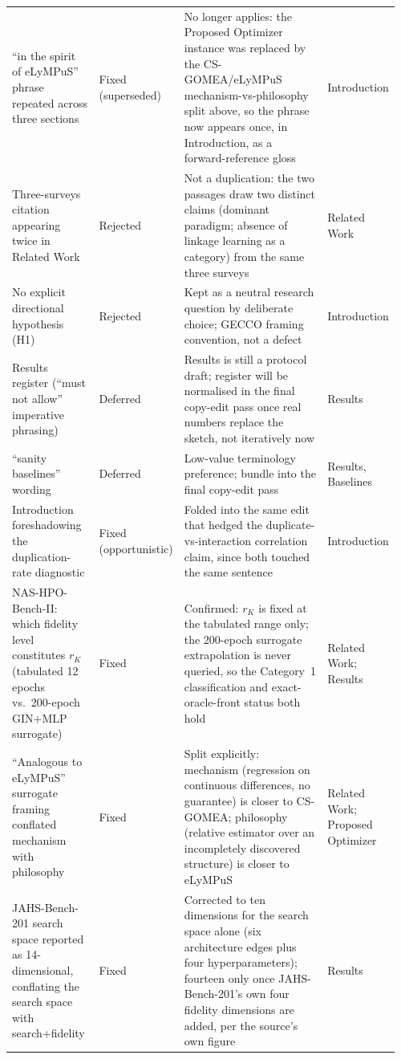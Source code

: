 \begin{longtable}{p{0.24\linewidth} p{0.08\linewidth} p{0.55\linewidth} p{0.09\linewidth}}
``in the spirit of eLyMPuS'' phrase repeated across three sections & Fixed (superseded) & No longer applies: the Proposed Optimizer instance was replaced by the CS-GOMEA/eLyMPuS mechanism-vs-philosophy split above, so the phrase now appears once, in Introduction, as a forward-reference gloss & Introduction \\
Three-surveys citation appearing twice in Related Work & Rejected & Not a duplication: the two passages draw two distinct claims (dominant paradigm; absence of linkage learning as a category) from the same three surveys & Related Work \\
No explicit directional hypothesis (H1) & Rejected & Kept as a neutral research question by deliberate choice; GECCO framing convention, not a defect & Introduction \\
Results register (``must not allow'' imperative phrasing) & Deferred & Results is still a protocol draft; register will be normalised in the final copy-edit pass once real numbers replace the sketch, not iteratively now & Results \\
``sanity baselines'' wording & Deferred & Low-value terminology preference; bundle into the final copy-edit pass & Results, Baselines \\
Introduction foreshadowing the duplication-rate diagnostic & Fixed (opportunistic) & Folded into the same edit that hedged the duplicate-vs-interaction correlation claim, since both touched the same sentence & Introduction \\
NAS-HPO-Bench-II: which fidelity level constitutes $r_K$ (tabulated 12 epochs vs.\ 200-epoch GIN+MLP surrogate) & Fixed & Confirmed: $r_K$ is fixed at the tabulated range only; the 200-epoch surrogate extrapolation is never queried, so the Category~1 classification and exact-oracle-front status both hold & Related Work; Results \\
``Analogous to eLyMPuS'' surrogate framing conflated mechanism with philosophy & Fixed & Split explicitly: mechanism (regression on continuous differences, no guarantee) is closer to CS-GOMEA; philosophy (relative estimator over an incompletely discovered structure) is closer to eLyMPuS & Related Work; Proposed Optimizer \\
JAHS-Bench-201 search space reported as 14-dimensional, conflating the search space with search+fidelity & Fixed & Corrected to ten dimensions for the search space alone (six architecture edges plus four hyperparameters); fourteen only once JAHS-Bench-201's own four fidelity dimensions are added, per the source's own figure & Results \\

\end{longtable}
